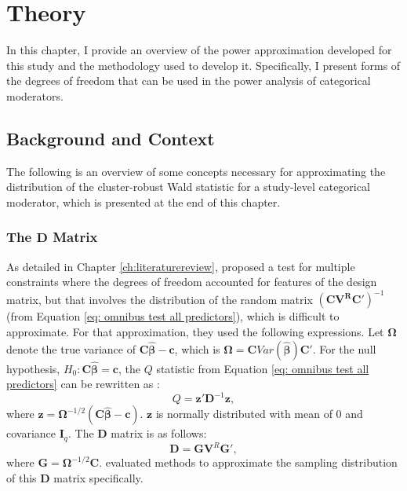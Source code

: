 \chapter{Theory} \label{ch: theory}

In this chapter, I provide an overview of the power approximation developed for this study and the methodology used to develop it. Specifically, I present forms of the degrees of freedom that can be used in the power analysis of categorical moderators. 


\section{Background and Context}
The following is an overview of some concepts necessary for approximating the distribution of the cluster-robust Wald statistic for a study-level categorical moderator, which is presented at the end of this chapter.

\subsection{The $\mathbf{D}$ Matrix}

 As detailed in Chapter \ref{ch:literaturereview}, \textcite{tipton2015b} proposed a test for multiple constraints where the degrees of freedom accounted for features of the design matrix, but that involves the distribution of the random matrix  $(\mathbf{C}\mathbf{V^R}\mathbf{C}')^{-1}$ (from Equation \ref{eq: omnibus test all predictors}), which is difficult to approximate. For that approximation, they used the following expressions. Let $\mathbf{\Omega}$ denote the true variance of $\mathbf{C}\bm{\hat{\beta}}-\mathbf{c}$, which is $\mathbf{\Omega} = \mathbf{C}Var(\bm{\hat{\beta}})\mathbf{C}'$. For the null hypothesis, $H_0: \mathbf{C}\mathbf{\hat{\beta}} = \mathbf{c}$, the $Q$ statistic from Equation \ref{eq: omnibus test all predictors} can be rewritten as \autocite{tipton2015b}:
\begin{equation} \label{eq: Q stat reformulation}
    Q = \mathbf{z}'\mathbf{D}^{-1}\mathbf{z},
\end{equation}
where  $\mathbf{z} = \mathbf{\Omega}^{-1/2}(\mathbf{C}\bm{\hat{\beta}}-\mathbf{c})$. $\mathbf{z}$ is normally distributed with mean of $0$ and covariance $\mathbf{I}_q$. The $\mathbf{D}$ matrix is as follows:
\begin{equation} \label{eq: D matrix}
    \mathbf{D} = \bm{G}\mathbf{V}^R\bm{G}',
\end{equation}
where $\bm{G} = \bm{\Omega}^{-1/2} \bm{C}$. \textcite{tipton2015b} evaluated methods to approximate the sampling distribution of this $\mathbf{D}$ matrix specifically. 

